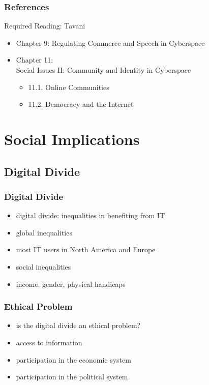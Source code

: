 \documentclass[dvipsnames]{beamer}
\theoremstyle{plain}
\begin{document}
\begin{frame}
  \frametitle{References}

  \begin{block}{Required Reading: Tavani}
    \begin{itemize}
      \item Chapter 9: \alert{Regulating Commerce and Speech in Cyberspace}
      \item Chapter 11:\\
        Social Issues II: Community and Identity in Cyberspace
      \begin{itemize}
          \item 11.1. \alert{Online Communities}
          \item 11.2. \alert{Democracy and the Internet}
      \end{itemize}
    \end{itemize}
  \end{block}
\end{frame}

\section{Social Implications}

\subsection{Digital Divide}

\begin{frame}
  \frametitle{Digital Divide}

  \begin{itemize}
    \item \alert{digital divide}:
      inequalities in benefiting from IT

    \medskip
    \item global inequalities
    \item most IT users in North America and Europe

    \medskip
    \item social inequalities
    \item income, gender, physical handicaps
  \end{itemize}
\end{frame}

\begin{frame}
  \frametitle{Ethical Problem}

  \begin{itemize}
    \item is the digital divide an ethical problem?

    \medskip
    \item access to information
    \item participation in the economic system
    \item participation in the political system
  \end{itemize}
\end{frame}
\end{document}
